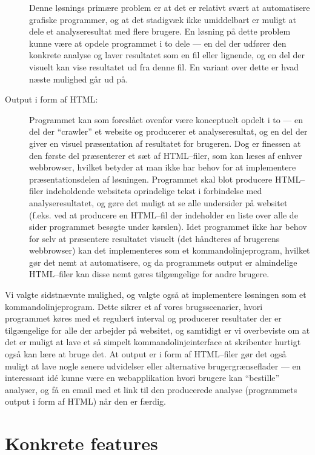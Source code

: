 \documentclass[a4paper,oneside]{memoir}
\begin{document}
\begin{description}
  Denne løsnings primære problem er at det er relativt svært at
  automatisere grafiske programmer, og at det stadigvæk ikke
  umiddelbart er muligt at dele et analyseresultat med flere
  brugere. En løsning på dette problem kunne være at opdele programmet
  i to dele --- en del der udfører den konkrete analyse og laver
  resultatet som en fil eller lignende, og en del der visuelt kan vise
  resultatet ud fra denne fil. En variant over dette er hvad næste
  mulighed går ud på.

\item[Output i form af HTML:]
  Programmet kan som foreslået ovenfor være konceptuelt opdelt i
  to --- en del der ``crawler'' et website og producerer et
  analyseresultat, og en del der giver en visuel præsentation af
  resultatet for brugeren. Dog er finessen at den første del
  præsenterer et sæt af HTML--filer, som kan læses af enhver
  webbrowser, hvilket betyder at man ikke har behov for at implementere
  præsentationsdelen af løsningen. Programmet skal blot producere
  HTML--filer indeholdende websitets oprindelige tekst i forbindelse
  med analyseresultatet, og gøre det muligt at se alle undersider på
  websitet (f.eks. ved at producere en HTML--fil der indeholder en
  liste over alle de sider programmet besøgte under kørslen). Idet
  programmet ikke har behov for selv at præsentere resultatet visuelt
  (det håndteres af brugerens webbrowser) kan det implementeres som et
  kommandolinjeprogram, hvilket gør det nemt at automatisere, og da
  programmets output er almindelige HTML--filer kan disse nemt gøres
  tilgængelige for andre brugere.
\end{description}

Vi valgte sidstnævnte mulighed, og valgte også at implementere
løsningen som et kommandolinjeprogram. Dette sikrer et af vores
brugsscenarier, hvori programmet køres med et regulært interval og
producerer resultater der er tilgængelige for alle der arbejder på
websitet, og samtidigt er vi overbeviste om at det er muligt at lave
et så simpelt kommandolinjeinterface at skribenter hurtigt også kan
lære at bruge det. At output er i form af HTML--filer gør det også
muligt at lave nogle senere udvidelser eller alternative
brugergrænseflader --- en interessant idé kunne være en webapplikation
hvori brugere kan ``bestille'' analyser, og få en email med et link
til den producerede analyse (programmets output i form af HTML) når
den er færdig.

\section{Konkrete features}
\end{document}
